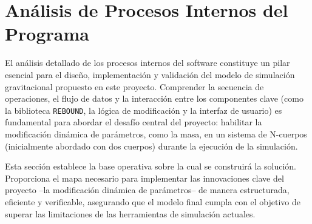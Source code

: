 \section{Análisis de Procesos Internos del Programa}

El análisis detallado de los procesos internos del software constituye un pilar esencial para el diseño, implementación y validación del modelo de simulación gravitacional propuesto en este proyecto. Comprender la secuencia de operaciones, el flujo de datos y la interacción entre los componentes clave (como la biblioteca \texttt{REBOUND}, la lógica de modificación y la interfaz de usuario) es fundamental para abordar el desafío central del proyecto: habilitar la modificación dinámica de parámetros, como la masa, en un sistema de N-cuerpos (inicialmente abordado con dos cuerpos) durante la ejecución de la simulación.

Esta sección establece la base operativa sobre la cual se construirá la solución. Proporciona el mapa necesario para implementar las innovaciones clave del proyecto –la modificación dinámica de parámetros– de manera estructurada, eficiente y verificable, asegurando que el modelo final cumpla con el objetivo de superar las limitaciones de las herramientas de simulación actuales.



